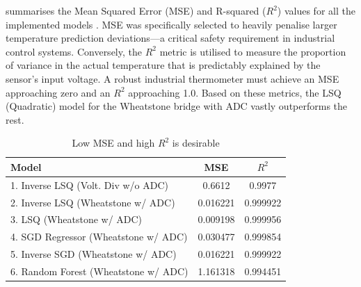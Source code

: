 \documentclass[conference]{IEEEtran}
\begin{document}
 summarises the Mean Squared Error (MSE) and R-squared ($R^2$) values for all the implemented models \cite{MSER2}. 
MSE was specifically selected to heavily penalise larger temperature prediction deviations—a critical safety requirement in industrial control systems. Conversely, the $R^2$ metric is utilised to measure the proportion of variance in the actual temperature that is predictably explained by the sensor's input voltage. A robust industrial thermometer must achieve an MSE approaching zero and an $R^2$ approaching 1.0. 
Based on these metrics, the LSQ (Quadratic) model for the Wheatstone bridge with ADC vastly outperforms the rest.
    \begin{table}[H]
    \centering
	\caption{Low MSE and high $R^2$ is desirable}
    \label{tab:model_performance}
    \begin{tabularx}{\columnwidth}{|X|c|c|} 
        \hline
        \textbf{Model} & \textbf{MSE} & \textbf{$R^2$} \\
        \hline
        1. Inverse LSQ (Volt. Div w/o ADC) & 0.6612 & 0.9977 \\
        \hline
        2. Inverse LSQ (Wheatstone w/ ADC) & 0.016221 & 0.999922 \\
        \hline
        3. LSQ (Wheatstone w/ ADC) & 0.009198 & 0.999956 \\
        \hline
        4. SGD Regressor (Wheatstone w/ ADC) & 0.030477 & 0.999854 \\
        \hline
        5. Inverse SGD (Wheatstone w/ ADC) & 0.016221 & 0.999922 \\
        \hline
        6. Random Forest (Wheatstone w/ ADC) & 1.161318 & 0.994451 \\
        \hline
    \end{tabularx}
\end{table}

\end{document}
